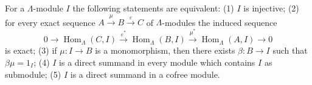For a $\Lambda$-module $I$ the following statements are equivalent:
(1) $I$ is injective;
(2) for every exact sequence $A \xrightarrow{\mu} B \xrightarrow{\varepsilon} C$ of $\Lambda$-modules the induced sequence
$$0 \to \operatorname{Hom}_\Lambda(C, I) \xrightarrow{\varepsilon^*} \operatorname{Hom}_\Lambda(B, I) \xrightarrow{\mu^*} \operatorname{Hom}_\Lambda(A, I) \to 0$$
is exact;
(3) if $\mu : I \to B$ is a monomorphism, then there exists $\beta : B \to I$ such that $\beta \mu = 1_I$;
(4) $I$ is a direct summand in every module which contains $I$ as submodule;
(5) $I$ is a direct summand in a cofree module.